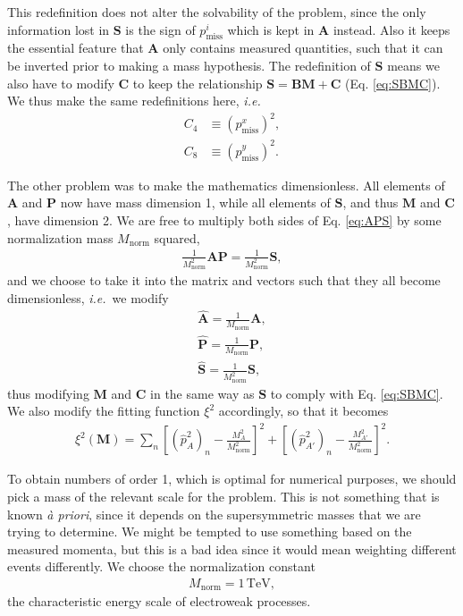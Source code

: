 \documentclass[twoside,english]{uiofysmaster}
\begin{document}
This redefinition does not alter the solvability of the problem, since the only information lost in $\mathbf{S}$ is the sign of $p_\mathrm{miss}^i$ which is kept in $\mathbf{A}$ instead. Also it keeps the essential feature that $\mathbf{A}$ only contains measured quantities, such that it can be inverted prior to making a mass hypothesis. The redefinition of $\mathbf{S}$ means we also have to modify $\mathbf{C}$ to keep the relationship $\mathbf{S} = \mathbf{B} \mathbf{M} + \mathbf{C}$ (Eq. \eqref{eq:SBMC}). We thus make the same redefinitions here, {\it i.e.}
\begin{align}
	C_4 &\equiv (p_\mathrm{miss}^x)^2, \label{eq:Cvec_modified} \\
	C_8 &\equiv (p_\mathrm{miss}^y)^2. \nonumber
\end{align}

The other problem was to make the mathematics dimensionless. All elements of $\mathbf{A}$ and $\mathbf{P}$ now have mass dimension 1, while all elements of $\mathbf{S}$, and thus $\mathbf{M}$ and $\mathbf{C}$, have dimension 2. We are free to multiply both sides of Eq. \eqref{eq:APS} by some normalization mass $M_\mathrm{norm}$ squared,
\begin{align}
	\frac{1}{M_\mathrm{norm}^2} \mathbf{A}\mathbf{P} = \frac{1}{M_\mathrm{norm}^2} \mathbf{S},
\end{align}
and we choose to take it into the matrix and vectors such that they all become dimensionless, {\it i.e.}\ we modify
\begin{align}
	\mathbf{\hat A} = \frac{1}{M_\mathrm{norm}}\mathbf{A},\nonumber \\
	\mathbf{\hat P} = \frac{1}{M_\mathrm{norm}}\mathbf{P},\label{eq:vectors_normalized}\\
	\mathbf{\hat S} = \frac{1}{M_\mathrm{norm}^2}\mathbf{S},\nonumber 
\end{align}
thus modifying $\mathbf{M}$ and $\mathbf{C}$ in the same way as $\mathbf{S}$ to comply with Eq. \eqref{eq:SBMC}. We also modify the fitting function $\xi^2$ accordingly, so that it becomes
\begin{align}
	\xi^2(\mathbf{M}) = \sum_n \left[(\hat p_{A}^2)_n - \frac{M_A^2}{M_\mathrm{norm}^2}\right]^2 + \left[(\hat p_{A'}^2)_n - \frac{M_{A'}^2}{M_\mathrm{norm}^2}\right]^2.\label{eq:xisquared_modified}
\end{align}

To obtain numbers of order 1, which is optimal for numerical purposes, we should pick a mass of the relevant scale for the problem. This is not something that is known {\it \`a priori}, since it depends on the supersymmetric masses that we are trying to determine. We might be tempted to use something based on the measured momenta, but this is a bad idea since it would mean weighting different events differently. We choose the normalization constant
\begin{align}
	M_\mathrm{norm} = 1 \,\mathrm{TeV},
\end{align}
the characteristic energy scale of electroweak processes.
\end{document}
